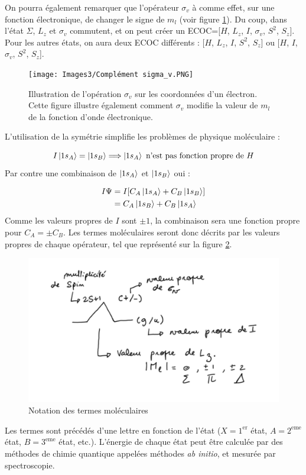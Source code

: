 On pourra également remarquer que l'opérateur $\sigma_v$ à comme effet, sur une fonction électronique, de changer le signe de $m_l$ (voir figure \ref{fig:sigma_v}). Du coup, dans l'état $\Sigma$, $L_z$ et $\sigma_v$ commutent, et on peut créer un ECOC=[$H$, $L_z$, $I$, $\sigma_v$, $S^2$, $S_z$]. Pour les autres états, on aura deux ECOC différents : [$H$, $L_z$, $I$, $S^2$, $S_z$] ou [$H$, $I$, $\sigma_v$, $S^2$, $S_z$].
\begin{figure}[tpb]
    \centering
    \texttt{[image: Images3/Complément sigma\_v.PNG]}
    \caption{Illustration de l’opération $\sigma_v$ sur les coordonnées d’un électron. Cette figure illustre également comment $\sigma_v$ modifie la valeur de $m_l$ de la fonction d’onde électronique.}
    \label{fig:sigma_v}
\end{figure}
L'utilisation de la symétrie simplifie les problèmes de physique moléculaire :

\[
    I\ket{1s_A} = \ket{1s_B} \Longrightarrow \ket{1s_A} \textrm{ n'est pas fonction propre de $H$}
\]
Par contre une combinaison de $\ket{1s_A}$ et $\ket{1s_B}$ oui :

\begin{align*}
    I\Psi &= I[C_A\ket{1s_A} + C_B\ket{1s_B}]\\
    &= C_A\ket{1s_B} + C_B\ket{1s_A}
\end{align*}
Comme les valeurs propres de $I$ sont $\pm 1$, la combinaison sera une fonction propre pour $C_A = \pm C_B$.
Les termes moléculaires seront donc décrits par les valeurs propres de chaque opérateur, tel que représenté sur la figure \ref{fig:notation}.
\begin{figure}
    \centering
    \includegraphics[scale=0.6]{Images3/Notation_mol.PNG}
    \caption{Notation des termes moléculaires}
    \label{fig:notation}
\end{figure}
Les termes sont précédés d'une lettre en fonction de l'état ($X = 1^\text{er}$ état, $A = 2^\text{eme}$ état, $B = 3^\text{eme}$ état, etc.).
L'énergie de chaque état peut être calculée par des méthodes de chimie quantique appelées méthodes \textit{ab initio}, et mesurée par spectroscopie.


